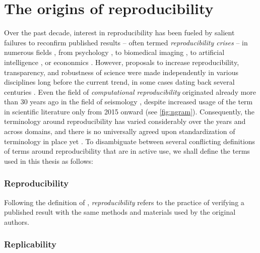 \section{The origins of reproducibility}

Over the past decade, interest in reproducibility has been fueled by salient failures to reconfirm published results -- often termed \textit{reproducibility crises} -- in numerous fields \citep{baker20161}, from psychology \citep{open2015estimating}, to biomedical imaging \citep{wagner202310}, to artificial intelligence \citep{hutson2018artificial}, or econonmics \citep{camerer2016evaluating}.
However, proposals to increase reproducibility, transparency, and robustness of science were made independently in various disciplines long before the current trend, in some cases dating back several centuries \citep[such as Boyle (1666), as cited in][]{RobertBoylesDesigneaboutNaturalHistory}.
Even the field of \textit{computational reproducibility} originated already more than 30 years ago in the field of seismology \citep{claerbout1992electronic, buckheit1995wavelab}, despite increased usage of the term in scientific literature only from 2015 onward (see \cref{fig:ngram}).
Consequently, the terminology around reproducibility has varied considerably over the years and across domains, and there is no universally agreed upon standardization of terminology in place yet \citep{barba2018terminologies}.
To disambiguate between several conflicting definitions of terms around reproducibility that are in active use, we shall define the terms used in this thesis as follows:

\subsubsection{Reproducibility}

Following the definition of \citet{peng2006}, \textit{reproducibility} refers to the practice of verifying a published result with the same methods and materials used by the original authors.

\subsubsection{Replicability}

